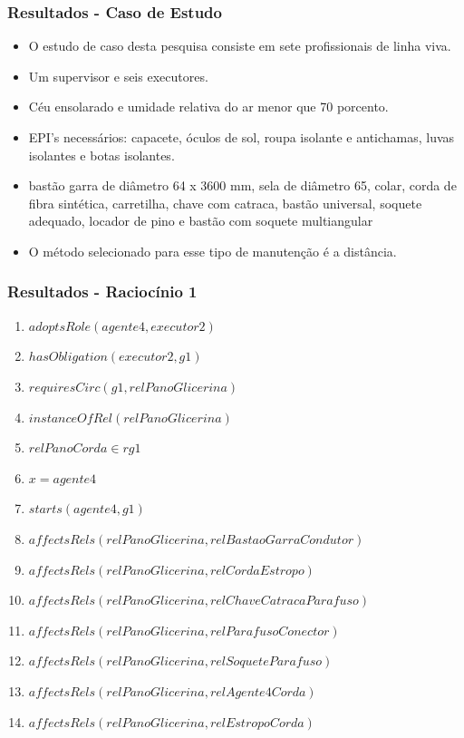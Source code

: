 \documentclass{beamer}
\begin{document}
\begin{frame}
	\frametitle{Resultados - Caso de Estudo}
	\begin{itemize}
		\item O estudo de caso desta pesquisa consiste em sete profissionais de linha viva.
		\item Um supervisor e seis executores.
		\item Céu ensolarado e umidade relativa do ar menor que 70 porcento.
		\item EPI's necessários: capacete, óculos de sol, roupa isolante e antichamas, luvas isolantes e botas isolantes.
		\item  bastão garra de diâmetro 64 x 3600 mm, sela de diâmetro 65, colar, corda de fibra sintética, carretilha, chave com catraca, bastão universal, soquete adequado, locador de pino e bastão com soquete multiangular
		\item O método selecionado para esse tipo de manutenção é a distância.
	\end{itemize}
\end{frame}
\begin{frame}
	\frametitle{Resultados - Raciocínio 1}
	\begin{enumerate}
		\item $adoptsRole(agente4,executor2)$ 
		\item $hasObligation(executor2,g1)$
		\item $requiresCirc(g1,relPanoGlicerina)$
		\item $instanceOfRel(relPanoGlicerina)$ 
		\item $relPanoCorda \in rg1$
		\item $ x = agente4 $
		\item $starts(agente4,g1)$
		\item $affectsRels(relPanoGlicerina,relBastaoGarraCondutor)$
		\item $affectsRels(relPanoGlicerina,relCordaEstropo)$  
		\item $affectsRels(relPanoGlicerina,relChaveCatracaParafuso)$
		\item $affectsRels(relPanoGlicerina,relParafusoConector)$ 
		\item $affectsRels(relPanoGlicerina,relSoqueteParafuso)$ 
		\item $affectsRels(relPanoGlicerina,relAgente4Corda)$ 
		\item $affectsRels(relPanoGlicerina,relEstropoCorda)$	
	\end{enumerate}
\end{frame}
\end{document}
